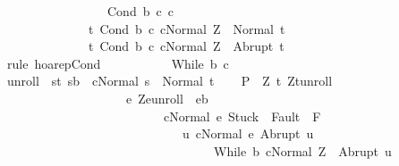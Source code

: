 \begin{isabellebody}
\ \ \ \ \ \ \ \ \ \ \ \ \ \ \ \ \ Cond\ b\ c{}\ c{}\isanewline
\ \ \ \ \ \ \ \ \ \ \ \ \ \ {\isacharbraceleft}t{\isachardot}\ {\isasymGamma}{\isasymturnstile}{\isasymlangle}Cond\ b\ c{}\ c{}{\isacharcomma}Normal\ Z{\isasymrangle}\ {\isasymRightarrow}\ Normal\ t{\isacharbraceright}{\isacharcomma}\isanewline
\ \ \ \ \ \ \ \ \ \ \ \ \ \ {\isacharbraceleft}t{\isachardot}\ {\isasymGamma}{\isasymturnstile}{\isasymlangle}Cond\ b\ c{}\ c{}{\isacharcomma}Normal\ Z{\isasymrangle}\ {\isasymRightarrow}\ Abrupt\ t{\isacharbraceright}{\isachardoublequoteclose}\isanewline
\ \ \ \ \isamarkupfalse%
\ {\isacharparenleft}rule\ hoarep{\isachardot}Cond{\isacharparenright}\ \ \ \ \ \ \ \isanewline
{}\isamarkupfalse%
\isanewline
\ \ \isamarkupfalse%
\ {\isacharparenleft}While\ b\ c{\isacharparenright}\isanewline
\ \ \isamarkupfalse%
\ {\isacharquery}unroll\ {\isacharequal}\ {\isachardoublequoteopen}{\isacharparenleft}{\isacharbraceleft}{\isacharparenleft}s{\isacharcomma}t{\isacharparenright}{\isachardot}\ s{\isasymin}b\ {\isasymand}\ {\isasymGamma}{\isasymturnstile}{\isasymlangle}c{\isacharcomma}Normal\ s{\isasymrangle}\ {\isasymRightarrow}\ Normal\ t{\isacharbraceright}{\isacharparenright}\isactrlsup {\isacharasterisk}{\isachardoublequoteclose}\isanewline
\ \ \isamarkupfalse%
\ {\isacharquery}P{\isacharprime}\ {\isacharequal}\ {\isachardoublequoteopen}{\isasymlambda}Z{\isachardot}\ {\isacharbraceleft}t{\isachardot}\ {\isacharparenleft}Z{\isacharcomma}t{\isacharparenright}{\isasymin}{\isacharquery}unroll\ {\isasymand}\ \isanewline
\ \ \ \ \ \ \ \ \ \ \ \ \ \ \ \ \ \ \ \ {\isacharparenleft}{\isasymforall}e{\isachardot}\ {\isacharparenleft}Z{\isacharcomma}e{\isacharparenright}{\isasymin}{\isacharquery}unroll\ {\isasymlongrightarrow}\ e{\isasymin}b\isanewline
\ \ \ \ \ \ \ \ \ \ \ \ \ \ \ \ \ \ \ \ \ \ \ \ \ {\isasymlongrightarrow}\ {\isasymGamma}{\isasymturnstile}{\isasymlangle}c{\isacharcomma}Normal\ e{\isasymrangle}\ {\isasymRightarrow}{\isasymnotin}{\isacharparenleft}{\isacharbraceleft}Stuck{\isacharbraceright}\ {\isasymunion}\ Fault\ {\isacharbackquote}\ {\isacharparenleft}{\isacharminus}F{\isacharparenright}{\isacharparenright}\ {\isasymand}\ \isanewline
\ \ \ \ \ \ \ \ \ \ \ \ \ \ \ \ \ \ \ \ \ \ \ \ \ \ \ \ \ {\isacharparenleft}{\isasymforall}u{\isachardot}\ {\isasymGamma}{\isasymturnstile}{\isasymlangle}c{\isacharcomma}Normal\ e{\isasymrangle}\ {\isasymRightarrow}Abrupt\ u\ {\isasymlongrightarrow}\ \isanewline
\ \ \ \ \ \ \ \ \ \ \ \ \ \ \ \ \ \ \ \ \ \ \ \ \ \ \ \ \ \ \ \ \ \ {\isasymGamma}{\isasymturnstile}{\isasymlangle}While\ b\ c{\isacharcomma}Normal\ Z{\isasymrangle}\ {\isasymRightarrow}\ Abrupt\ u{\isacharparenright}{\isacharparenright}{\isacharbraceright}{\isachardoublequoteclose}\isanewline

\end{isabellebody}
